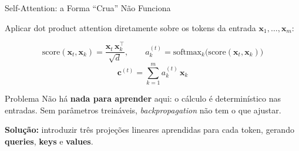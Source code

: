 \documentclass[aspectratio=169,xcolor=dvipsnames]{beamer}
\begin{document}
\begin{frame}{Self-Attention: a Forma ``Crua'' Não Funciona}

Aplicar dot product attention diretamente sobre os tokens da entrada $\mathbf{x}_1, \dots, \mathbf{x}_m$:

\vspace{4pt}

\[
\mathrm{score}(\mathbf{x}_t, \mathbf{x}_k) = \frac{\mathbf{x}_t \, \mathbf{x}_k^{\top}}{\sqrt{d}}, \qquad
a_k^{(t)} = \mathrm{softmax}_k\bigl(\mathrm{score}(\mathbf{x}_t, \mathbf{x}_k)\bigr)
\]
\[
\mathbf{c}^{(t)} = \sum_{k=1}^{m} a_k^{(t)} \, \mathbf{x}_k
\]

\vspace{6pt}

\begin{alertblock}{Problema}
Não há \textbf{nada para aprender} aqui: o cálculo é determinístico nas entradas. Sem parâmetros treináveis, \textit{backpropagation} não tem o que ajustar.
\end{alertblock}

\vspace{6pt}

\textbf{Solução:} introduzir três projeções lineares aprendidas para cada token, gerando \textbf{queries}, \textbf{keys} e \textbf{values}.

\end{frame}

\end{document}
